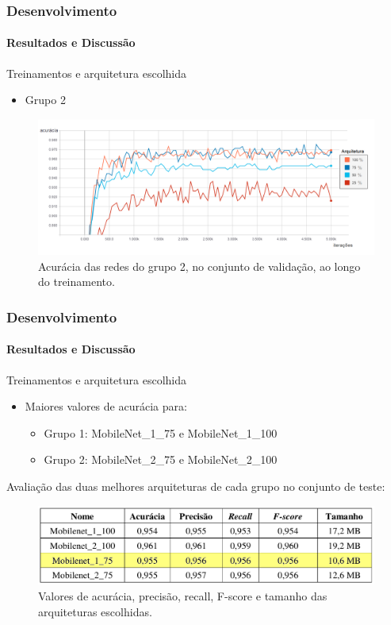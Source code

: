 \documentclass{beamer}
\begin{document}
    \begin{frame}[t]
      \frametitle{Desenvolvimento}
      \framesubtitle{Resultados e Discussão} \medskip       
      	Treinamentos e arquitetura escolhida \medskip    
      	\begin{itemize}
      		\item Grupo 2
		\end{itemize}      	  	
		\begin{figure}[t]
      		 \begin{minipage}[h]{1.0\linewidth}
         		\centering
      			\includegraphics[height=0.42\linewidth]{img/acc_2_5000.png}
      			\caption{Acurácia das redes do grupo 2, no conjunto de validação, ao longo do treinamento.}
      		\end{minipage}
      		\vspace{0.00mm}
      	\end{figure}	      	       
    \end{frame}
    
    \begin{frame}[t]
    		\frametitle{Desenvolvimento}
    		\framesubtitle{Resultados e Discussão}
       	Treinamentos e arquitetura escolhida \medskip    
    		\begin{itemize}
      		\item Maiores valores de acurácia para:
			\begin{itemize}
				\item Grupo 1: MobileNet\_1\_75 e MobileNet\_1\_100
				\item Grupo 2: MobileNet\_2\_75 e MobileNet\_2\_100 \medskip
			\end{itemize}	      		
		\end{itemize}		
		{
			Avaliação das duas melhores arquiteturas de cada grupo no conjunto de teste:
			\visible<3->
			{
				\begin{figure}[hbt]
      	 		\begin{center}
      			\includegraphics[height=.2 \textwidth]{img/all_metrics_2.png}
      			\end{center}
      			\caption{Valores de acurácia, precisão, recall, F-score e tamanho das arquiteturas escolhidas.}
      			\end{figure}	
			}
		}       	      	
    \end{frame}
	
\end{document}
